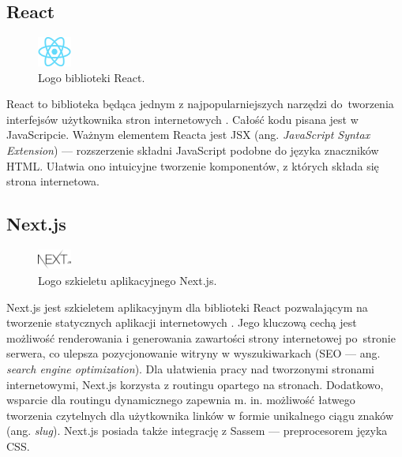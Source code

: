 \documentclass[a4paper, 12pt]{article}
\numberwithin{figure}{section}
\begin{document}
\begin{sloppypar}

\subsection*{React}

\begin{figure}[H] 
    \centering
        \includegraphics[width=0.1\textwidth]{images/react-logo.png}
   \caption{Logo biblioteki React.}
\end{figure}

React to biblioteka będąca jednym z najpopularniejszych narzędzi do~tworzenia interfejsów użytkownika stron internetowych \cite{react}. Całość kodu pisana jest w JavaScripcie. Ważnym elementem Reacta jest JSX (ang. \textit{JavaScript Syntax Extension}) --- rozszerzenie składni JavaScript podobne do języka znaczników HTML. Ułatwia ono intuicyjne tworzenie komponentów, z których składa się strona internetowa.


\subsection*{Next.js}

\begin{figure}[H] 
    \centering
        \includegraphics[width=0.1\textwidth]{images/next-logo.png}
   \caption{Logo szkieletu aplikacyjnego Next.js.}
\end{figure}

Next.js jest szkieletem aplikacyjnym dla biblioteki React pozwalającym na tworzenie statycznych aplikacji internetowych \cite{next}. Jego kluczową cechą jest możliwość renderowania i generowania zawartości strony internetowej po~stronie serwera, co ulepsza pozycjonowanie witryny w wyszukiwarkach (SEO --- ang. \textit{search engine optimization}). Dla ułatwienia pracy nad tworzonymi stronami internetowymi, Next.js korzysta z routingu opartego na stronach. Dodatkowo, wsparcie dla routingu dynamicznego zapewnia m. in. możliwość łatwego tworzenia czytelnych dla użytkownika linków w formie unikalnego ciągu znaków (ang. \textit{slug}). Next.js posiada także integrację z Sassem --- preprocesorem języka CSS.


\end{sloppypar}
\end{document}
